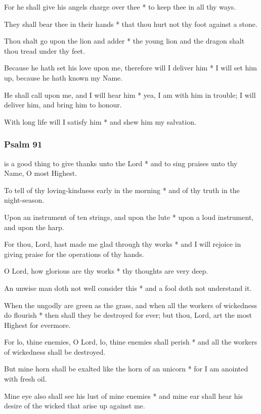 For he shall give his angels charge over thee * to keep thee in all thy ways.

They shall bear thee in their hands * that thou hurt not thy foot against a stone.

Thou shalt go upon the lion and adder * the young lion and the dragon shalt thou tread under thy feet.

Because he hath set his love upon me, therefore will I deliver him * I will set him up, because he hath known my Name.

He shall call upon me, and I will hear him * yea, I am with him in trouble; I will deliver him, and bring him to honour.

With long life will I satisfy him * and shew him my salvation.



\subsubsection{Psalm 91}


 is a good thing to give thanks unto the Lord * and to sing praises unto thy Name, O most Highest.

To tell of thy loving-kindness early in the morning * and of thy truth in the night-season.

Upon an instrument of ten strings, and upon the lute * upon a loud instrument, and upon the harp.

For thou, Lord, hast made me glad through thy works * and I will rejoice in giving praise for the operations of thy hands.

O Lord, how glorious are thy works * thy thoughts are very deep.

An unwise man doth not well consider this * and a fool doth not understand it.

When the ungodly are green as the grass, and when all the workers of wickedness do flourish * then shall they be destroyed for ever; but thou, Lord, art the most Highest for evermore.

For lo, thine enemies, O Lord, lo, thine enemies shall perish * and all the workers of wickedness shall be destroyed.

But mine horn shall be exalted like the horn of an unicorn * for I am anointed with fresh oil.

Mine eye also shall see his lust of mine enemies * and mine ear shall hear his desire of the wicked that arise up against me.

